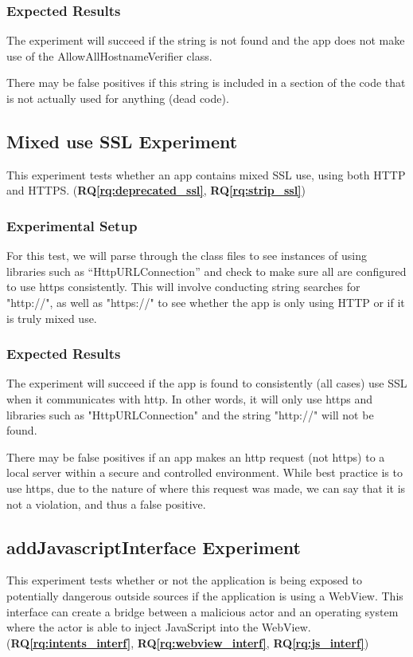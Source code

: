 \documentclass[10pt,twocolumn,pdftex]{article}
\newcommand{\rqref}[1]{\textbf{RQ\ref{#1}}}
\begin{document}
    \subsubsection{Expected Results}
    The experiment will succeed if the string is not found and the app does not make use of the AllowAllHostnameVerifier class.
    
    There may be false positives if this string is included in a section of the code that is not actually used for anything (dead code).


\subsection{Mixed use SSL Experiment}
This experiment tests whether an app contains mixed SSL use, using both HTTP and HTTPS. (\rqref{rq:deprecated_ssl}, \rqref{rq:strip_ssl})
    
    \subsubsection{Experimental Setup}
    For this test, we will parse through the class files to see instances of using libraries such as “HttpURLConnection” and check to make sure all are configured to use https consistently. This will involve conducting string searches for "http://", as well as "https://" to see whether the app is only using HTTP or if it is truly mixed use. 
    
    \subsubsection{Expected Results}
    The experiment will succeed if the app is found to consistently (all cases) use SSL when it communicates with http. In other words, it will only use https and libraries such as "HttpURLConnection" and the string "http://" will not be found. 
    
    There may be false positives if an app makes an http request (not https) to a local server within a secure and controlled environment. While best practice is to use https, due to the nature of where this request was made, we can say that it is not a violation, and thus a false positive.
    

\subsection{addJavascriptInterface Experiment}
This experiment tests whether or not the application is being exposed to potentially dangerous outside sources if the application is using a WebView. This interface can create a bridge between a malicious actor and an operating system where the actor is able to inject JavaScript into the WebView. (\rqref{rq:intents_interf}, \rqref{rq:webview_interf}, \rqref{rq:js_interf})
\end{document}
